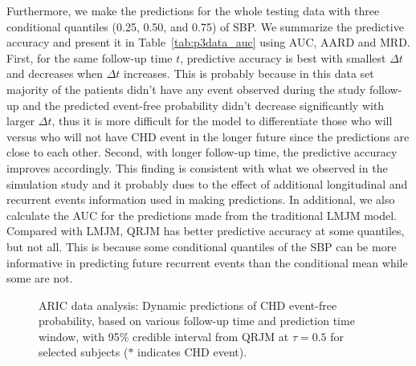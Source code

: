 Furthermore, we make the predictions for the whole testing data with three conditional quantiles (0.25, 0.50, and 0.75) of SBP. We summarize the predictive accuracy and present it in Table~\ref{tab:p3data_auc} using AUC, AARD and MRD. First, for the same follow-up time $t$, predictive accuracy is best with smallest $\Delta t$ and decreases when $\Delta t$ increases. This is probably because in this data set majority of the patients didn't have any event observed during the study follow-up and the predicted event-free probability didn't decrease significantly with larger $\Delta t$, thus it is more difficult for the model to differentiate those who will versus who will not have CHD event in the longer future since the predictions are close to each other. Second, with longer follow-up time, the predictive accuracy improves accordingly. This finding is consistent with what we observed in the simulation study and it probably dues to the effect of additional longitudinal and recurrent events information used in making predictions. In additional, we also calculate the AUC for the predictions made from the traditional LMJM model. Compared with LMJM, QRJM has better predictive accuracy at some quantiles, but not all. This is because some conditional quantiles of the SBP can be more informative in predicting future recurrent events than the conditional mean while some are not.


\begin{figure}[H]
\captionsetup[subfloat]{farskip=-5pt,captionskip=-1pt}
\centering
{}

\centering
{}

\centering
{}
  \caption{ARIC data analysis: Dynamic predictions of CHD event-free probability, based on various follow-up time and prediction time window, with 95\% credible interval from QRJM at $\tau=0.5$ for selected subjects ($*$ indicates CHD event).}
  \label{plot:p3realdata_pred_surv_qt50}
\end{figure}





